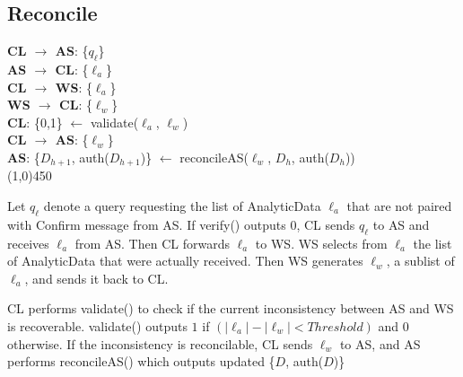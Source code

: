 \subsection{Reconcile}
\begin{framed}
\noindent
\textbf{CL $\rightarrow$ AS}: \textsf{\{$q_{\ell}$\}}		\\
\textbf{AS $\rightarrow$ CL}: \textsf{\{$\ell_a$\}}		\\

\noindent
\textbf{CL $\rightarrow$ WS}: \textsf{\{$\ell_a$\}}		\\
\textbf{WS $\rightarrow$ CL}: \textsf{\{$\ell_w$\}}		\\

\noindent
\textbf{CL}: \textsf{\{0,1\}} $\leftarrow$ \textsf{validate($\ell_a$, $\ell_w$)}		\\

\noindent
\textbf{CL $\rightarrow$ AS}: \textsf{\{$\ell_w$\}}		\\
\textbf{AS}: \textsf{\{$D_{h+1}$, auth($D_{h+1}$)\} $\leftarrow$ reconcileAS($\ell_w$, $D_h$, auth($D_h$))}	\\
\line(1,0){450}

\noindent
Let $q_\ell$ denote a query requesting the list of \textsf{AnalyticData} $\ell_a$ that are not paired with \textsf{Confirm} message from \textsf{AS}.
If \textsf{verify()} outputs $0$, \textsf{CL} sends $q_\ell$ to \textsf{AS} and receives $\ell_a$ from \textsf{AS}.
Then \textsf{CL} forwards $\ell_a$ to \textsf{WS}.
\textsf{WS} selects from $\ell_a$ the list of \textsf{AnalyticData} that were actually received.
Then \textsf{WS} generates $\ell_w$, a sublist of \textsf{$\ell_a$}, and sends it back to \textsf{CL}.

\noindent
\textsf{CL} performs \textsf{validate()} to check if the current inconsistency between \textsf{AS} and \textsf{WS} is recoverable. 
\textsf{validate()} outputs $1$ if $(|\ell_a| - |\ell_w| < Threshold )$ and $0$ otherwise.  
If the inconsistency is reconcilable, \textsf{CL} sends $\ell_w$ to \textsf{AS}, and \textsf{AS} performs \textsf{reconcileAS()} which outputs updated \textsf{\{$D$, auth($D$)\}}

\end{framed}

